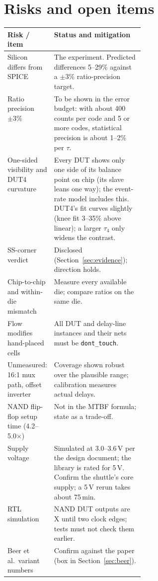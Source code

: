 \documentclass[11pt]{article}
\begin{document}
\section{Risks and open items}
\begin{table}[H]
\centering\small
\begin{tabularx}{\linewidth}{@{}p{0.32\linewidth}X@{}}
\toprule
Risk / item & Status and mitigation \\
\midrule
Silicon differs from SPICE & The experiment. Predicted differences 5--29\% against a $\pm3\%$ ratio-precision target. \\
Ratio precision $\pm3\%$ & To be shown in the error budget: with about 400 counts per code and 5 or more codes, statistical precision is about 1--2\% per $\tau$. \\
One-sided visibility and DUT4 curvature & Every DUT shows only one side of its balance point on chip (its slave leans one way); the event-rate model includes this. DUT4's fit curves slightly (knee fit 3--35\% above linear); a larger $\tau_4$ only widens the contrast. \\
SS-corner verdict & Disclosed (Section~\ref{sec:evidence}); direction holds. \\
Chip-to-chip and within-die mismatch & Measure every available die; compare ratios on the same die. \\
Flow modifies hand-placed cells & All DUT and delay-line instances and their nets must be \texttt{dont\_touch}. \\
Unmeasured: 16:1 mux path, offset inverter & Coverage shown robust over the plausible range; calibration measures actual delays. \\
NAND flip-flop setup time (4.2--5.0$\times$) & Not in the MTBF formula; state as a trade-off. \\
Supply voltage & Simulated at 3.0--3.6\,V per the design document; the library is rated for 5\,V. Confirm the shuttle's core supply; a 5\,V rerun takes about 75\,min. \\
RTL simulation & NAND DUT outputs are X until two clock edges; tests must not check them earlier. \\
Beer et al.\ variant numbers & Confirm against the paper (box in Section~\ref{sec:beer}). \\
\bottomrule
\end{tabularx}
\end{table}

\end{document}
